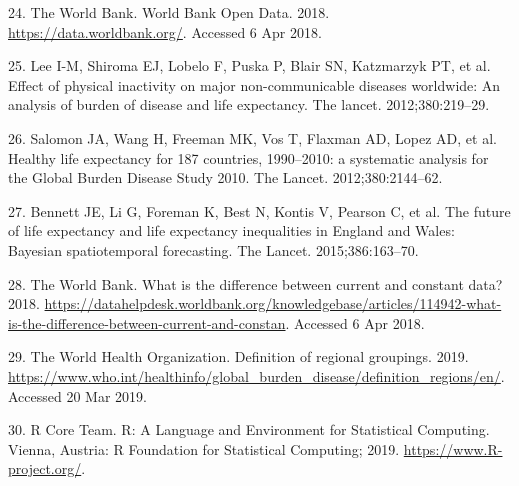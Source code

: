\documentclass[]{elsarticle} %
\begin{document}
\leavevmode\hypertarget{ref-worldbank}{}%
24. The World Bank. World Bank Open Data. 2018. \url{https://data.worldbank.org/}. Accessed 6 Apr 2018.

\leavevmode\hypertarget{ref-lee2012effect}{}%
25. Lee I-M, Shiroma EJ, Lobelo F, Puska P, Blair SN, Katzmarzyk PT, et al. Effect of physical inactivity on major non-communicable diseases worldwide: An analysis of burden of disease and life expectancy. The lancet. 2012;380:219--29.

\leavevmode\hypertarget{ref-salomon2012healthy}{}%
26. Salomon JA, Wang H, Freeman MK, Vos T, Flaxman AD, Lopez AD, et al. Healthy life expectancy for 187 countries, 1990--2010: a systematic analysis for the Global Burden Disease Study 2010. The Lancet. 2012;380:2144--62.

\leavevmode\hypertarget{ref-bennett2015future}{}%
27. Bennett JE, Li G, Foreman K, Best N, Kontis V, Pearson C, et al. The future of life expectancy and life expectancy inequalities in England and Wales: Bayesian spatiotemporal forecasting. The Lancet. 2015;386:163--70.

\leavevmode\hypertarget{ref-worldbankconstant}{}%
28. The World Bank. What is the difference between current and constant data? 2018. \url{https://datahelpdesk.worldbank.org/knowledgebase/articles/114942-what-is-the-difference-between-current-and-constan}. Accessed 6 Apr 2018.

\leavevmode\hypertarget{ref-WHOregion}{}%
29. The World Health Organization. Definition of regional groupings. 2019. \url{https://www.who.int/healthinfo/global_burden_disease/definition_regions/en/}. Accessed 20 Mar 2019.

\leavevmode\hypertarget{ref-R353}{}%
30. R Core Team. R: A Language and Environment for Statistical Computing. Vienna, Austria: R Foundation for Statistical Computing; 2019. \url{https://www.R-project.org/}.
\end{document}
